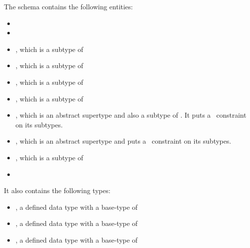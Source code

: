 \documentclass{article}
\begin{document}
The schema contains the following entities:

\begin{itemize}

\item {}

\item {}

\item {}, which is a subtype of 

\item {}, which is a subtype of 

\item {}, which is a subtype of 

\item {}, which is a subtype of 

\item {}, which is an abstract supertype and also a subtype
of . It puts a \zoneof\ constraint on its subtypes.

\item {}, which is an abstract supertype and puts a \zoneof\
constraint on its subtypes.

\item {}, which is a subtype of 

\item {}

\end{itemize}

It also contains the following types:

\begin{itemize}

\item {}, a defined data type with a base-type of
\zstring\

\item {}, a defined data type with a base-type of
\zreal\

\item {}, a defined data type with a base-type of \zstring\

\end{itemize}

\clearpage
\end{document}
